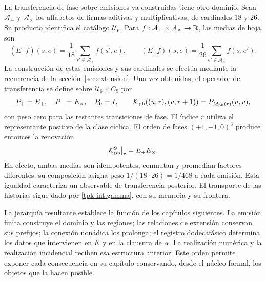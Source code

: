 La transferencia de fase sobre emisiones ya construidas tiene otro
dominio. Sean \(\mathcal A_+\) y \(\mathcal A_\times\) los
alfabetos de firmas aditivas y multiplicativas, de cardinales \(18\)
y \(26\). Su producto identifica el catálogo \(\mathcal U_6\).
Para \(f:\mathcal A_+\times\mathcal A_\times\to\mathbb R\),
las medias de hoja son
\[
 (E_+f)(s,e)=\frac1{18}\sum_{s'\in\mathcal A_+}f(s',e),\qquad
 (E_\times f)(s,e)=\frac1{26}\sum_{e'\in\mathcal A_\times}f(s,e').
\]
La construcción de estas emisiones y sus cardinales se efectúa mediante
la recurrencia de la sección~\ref{sec:extension}. Una vez obtenidas,
el operador de transferencia se define sobre
\(\mathcal U_6\times C_9\) por
\[
 P_+=E_+,\quad P_-=E_\times,\quad P_0=I,\qquad
 \mathcal K_{\rm ph}((u,r),(v,r+1))=P_{M_{\rm ph}(r)}(u,v),
\]
con peso cero para las restantes transiciones de fase. El índice
\(r\) utiliza el representante positivo de la clase cíclica.
El orden de fases \((+1,-1,0)^3\) produce entonces la renovación
\[
 \mathcal K_{\rm ph}^{9}\big|_r=E_+E_\times.
\]
En efecto, ambas medias son idempotentes, conmutan y promedian factores
diferentes; su composición asigna peso \(1/(18\cdot26)=1/468\)
a cada emisión. Esta igualdad caracteriza un observable de transferencia
posterior. El transporte de las historias sigue dado por
\eqref{tpk-int:gamma}, con su memoria y su frontera.

La jerarquía resultante establece la función de los capítulos siguientes.
La emisión finita construye el dominio y las regiones; las relaciones de
extensión conservan sus prefijos; la conexión nonádica los prolonga; el
registro dodecafásico determina los datos que intervienen en \(K\) y
en la clausura de \(\alpha\). La realización numérica y la realización
incidencial reciben esa estructura anterior. Este orden permite exponer
cada consecuencia en su capítulo conservando, desde el núcleo formal,
los objetos que la hacen posible.
